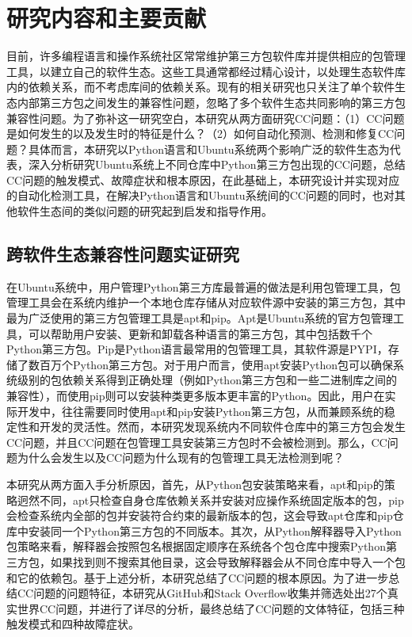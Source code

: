\section{研究内容和主要贡献}
目前，许多编程语言和操作系统社区常常维护第三方包软件库并提供相应的包管理工具，以建立自己的软件生态。这些工具通常都经过精心设计，以处理生态软件库内的依赖关系，而不考虑库间的依赖关系。现有的相关研究也只关注了单个软件生态内部第三方包之间发生的兼容性问题，忽略了多个软件生态共同影响的第三方包兼容性问题。为了弥补这一研究空白，本研究从两方面研究CC问题：（1）CC问题是如何发生的以及发生时的特征是什么？（2）如何自动化预测、检测和修复CC问题？具体而言，本研究以Python语言和Ubuntu系统两个影响广泛的软件生态为代表，深入分析研究Ubuntu系统上不同仓库中Python第三方包出现的CC问题，总结CC问题的触发模式、故障症状和根本原因，在此基础上，本研究设计并实现对应的自动化检测工具，在解决Python语言和Ubuntu系统间的CC问题的同时，也对其他软件生态间的类似问题的研究起到启发和指导作用。
\subsection{跨软件生态兼容性问题实证研究}\label{1.3.1}
在Ubuntu系统中，用户管理Python第三方库最普遍的做法是利用包管理工具，包管理工具会在系统内维护一个本地仓库存储从对应软件源中安装的第三方包，其中最为广泛使用的第三方包管理工具是apt和pip。Apt是Ubuntu系统的官方包管理工具，可以帮助用户安装、更新和卸载各种语言的第三方包，其中包括数千个Python第三方包。Pip是Python语言最常用的包管理工具，其软件源是PYPI，存储了数百万个Python第三方包。对于用户而言，使用apt安装Python包可以确保系统级别的包依赖关系得到正确处理（例如Python第三方包和一些二进制库之间的兼容性），而使用pip则可以安装种类更多版本更丰富的Python。因此，用户在实际开发中，往往需要同时使用apt和pip安装Python第三方包，从而兼顾系统的稳定性和开发的灵活性。然而，本研究发现系统内不同软件仓库中的第三方包会发生CC问题，并且CC问题在包管理工具安装第三方包时不会被检测到。那么，CC问题为什么会发生以及CC问题为什么现有的包管理工具无法检测到呢？

本研究从两方面入手分析原因，首先，从Python包安装策略来看，apt和pip的策略迥然不同，apt只检查自身仓库依赖关系并安装对应操作系统固定版本的包，pip会检查系统内全部的包并安装符合约束的最新版本的包，这会导致apt仓库和pip仓库中安装同一个Python第三方包的不同版本。其次，从Python解释器导入Python包策略来看，解释器会按照包名根据固定顺序在系统各个包仓库中搜索Python第三方包，如果找到则不搜索其他目录，这会导致解释器会从不同仓库中导入一个包和它的依赖包。基于上述分析，本研究总结了CC问题的根本原因。为了进一步总结CC问题的问题特征，本研究从GitHub和Stack Overflow收集并筛选处出27个真实世界CC问题，并进行了详尽的分析，最终总结了CC问题的文体特征，包括三种触发模式和四种故障症状。

